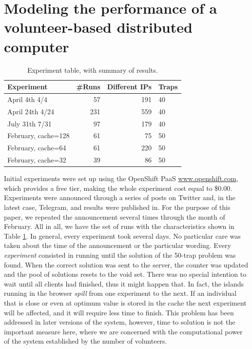 \documentclass[letterpaper]{article}
\begin{document}
\section{Modeling the performance of a volunteer-based distributed computer} 
\label{sec:experiments}

\begin{table}[htb]
\caption{Experiment table, with summary of results. \label{tab:runs}}
\begin{center}
\begin{tabular}{l|rrl}
\hline
Experiment & \#Runs & Different IPs & Traps \\
\hline
April 4th 4/4 & 57 & 191 & 40 \\
April 24th 4/24 &  231 & 559& 40  \\
July 31th 7/31 & 97 & 179 & 40 \\
\hline
February, cache=128 & 61 & 75 & 50  \\
February, cache=64 & 61 & 220 & 50  \\
February, cache=32 & 39 & 86 & 50  \\
\hline
\end{tabular}
\end{center}
\end{table}
%
Initial experiments were set up using the OpenShift
PaaS \url{www.openshift.com}, which provides a free tier, making the whole experiment cost
equal to \$0.00. Experiments were
announced through a series of posts on Twitter and, in the latest case, Telegram, and
results were published in\citep{DBLP:conf/gecco/GuervosG15}. For the
purpose of this paper, we repeated the announcement several times
through the month of February. All  %
in all, we have the set of runs with the characteristics shown in
Table \ref{tab:runs}. In general, every experiment took several
days. No particular care was taken about the time of the announcement
or the particular wording. Every {\em experiment} consisted in running
until the solution of the 50-trap problem was found. When the correct
solution was sent to the server, the counter was updated and the pool
of solutions resets to the void set. There was no special intention to wait
until all clients had finished, thus it might happen that. In fact,
the islands running in the browser {\em spill} from one experiment to
the next. 
If an individual that is close or even at optimum value is stored in the cache 
the next experiment will be affected, and it will require less time 
to finish. This problem has been addressed in later versions of the
system, however, time to solution is not the important measure here,
where we are concerned with the computational 
power of the system established by the number of volunteers. 
\end{document}
